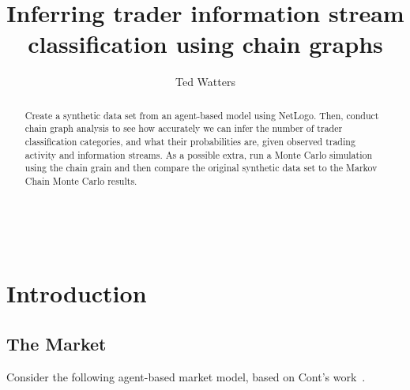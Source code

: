 \documentclass[a4paper, 11pt]{report}
\title{Inferring trader information stream classification using chain graphs}
\author{Ted Watters}
\begin{document}
\maketitle


\begin{abstract}
	Create a synthetic data set from an agent-based model using NetLogo. Then, conduct chain graph analysis to see how accurately we can infer the number of trader classification categories, and what their probabilities are, given observed trading activity and information streams. As a possible extra, run a Monte Carlo simulation using the chain grain and then compare the original synthetic data set to the Markov Chain Monte Carlo results.
\end{abstract}\
\tableofcontents
\chapter{Introduction}
\section{The Market}
Consider the following agent-based market model, based on Cont's work~\cite{ghoulmie_cont_nadal_2005}. 
\end{document}
